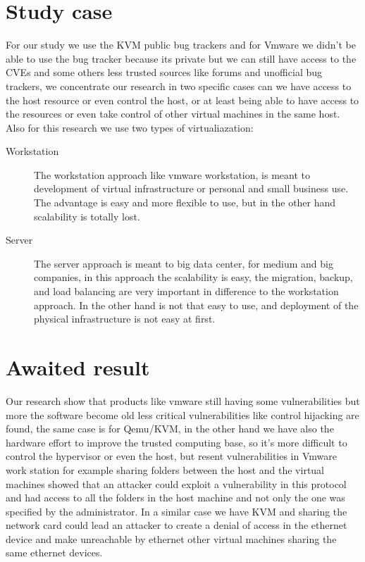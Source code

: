 \section{Study case}

For our study we use the KVM public bug trackers and for Vmware we didn't be able
to use the bug tracker because its private but we can still have access to the CVEs
and some others less trusted sources like forums and unofficial bug trackers,
we concentrate our research in two specific cases can we have access to the host
resource or even control the host, or at least being able to have access to the resources
or even take control of other virtual machines in the same host.
Also for this research we use two types of virtualiazation:
\begin{description}
\item[Workstation] The workstation approach like vmware workstation, is meant 
to development of virtual infrastructure or personal and small business use. The advantage 
is easy and more flexible to use, but in the other hand scalability is totally lost.
\item[Server] The server approach is meant to big data center, for medium and big companies,
in this approach the scalability is easy, the migration, backup, and load balancing are very important
in difference to the workstation approach. In the other hand is not that easy to use, and deployment
of the physical infrastructure is not easy at first.
\end{description}

\section{Awaited result}

Our research show that products like vmware still having some vulnerabilities but 
more the software become old less critical vulnerabilities like control hijacking are found,
the same case is for Qemu/KVM, in the other hand we have also the hardware effort to
improve the trusted computing base, so it's more difficult to control the hypervisor or even
the host, but resent vulnerabilities in Vmware work station for example sharing folders
between the host and the virtual machines showed that an attacker could exploit a vulnerability
in this protocol and had access to all the folders in the host machine and not only the one was
specified by the administrator.
In a similar case we have KVM and sharing the network card could lead an attacker to create
a denial of access in the ethernet device and make unreachable by ethernet other virtual machines
sharing the same ethernet devices. 
